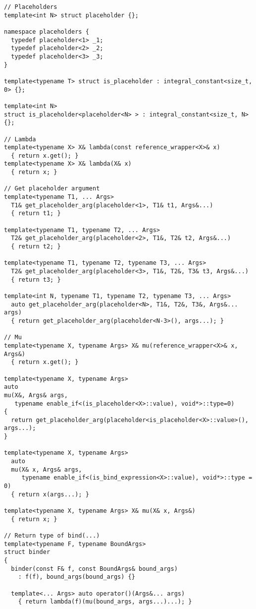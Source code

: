 \documentclass{article}
\begin{document}
\small
\begin{verbatim}
// Placeholders
template<int N> struct placeholder {};

namespace placeholders {
  typedef placeholder<1> _1;
  typedef placeholder<2> _2;
  typedef placeholder<3> _3;
}

template<typename T> struct is_placeholder : integral_constant<size_t, 0> {};

template<int N> 
struct is_placeholder<placeholder<N> > : integral_constant<size_t, N> {};

// Lambda
template<typename X> X& lambda(const reference_wrapper<X>& x)
  { return x.get(); }
template<typename X> X& lambda(X& x)
  { return x; }

// Get placeholder argument
template<typename T1, ... Args>
  T1& get_placeholder_arg(placeholder<1>, T1& t1, Args&...)
  { return t1; }

template<typename T1, typename T2, ... Args>
  T2& get_placeholder_arg(placeholder<2>, T1&, T2& t2, Args&...)
  { return t2; }

template<typename T1, typename T2, typename T3, ... Args>
  T2& get_placeholder_arg(placeholder<3>, T1&, T2&, T3& t3, Args&...)
  { return t3; }

template<int N, typename T1, typename T2, typename T3, ... Args>
  auto get_placeholder_arg(placeholder<N>, T1&, T2&, T3&, Args&... args)
  { return get_placeholder_arg(placeholder<N-3>(), args...); }

// Mu
template<typename X, typename Args> X& mu(reference_wrapper<X>& x, Args&)
  { return x.get(); }

template<typename X, typename Args>
auto 
mu(X&, Args& args, 
   typename enable_if<(is_placeholder<X>::value), void*>::type=0)
{ 
  return get_placeholder_arg(placeholder<is_placeholder<X>::value>(), args...);
}

template<typename X, typename Args>
  auto 
  mu(X& x, Args& args, 
     typename enable_if<(is_bind_expression<X>::value), void*>::type = 0)
  { return x(args...); }

template<typename X, typename Args> X& mu(X& x, Args&)
  { return x; }

// Return type of bind(...)
template<typename F, typename BoundArgs>
struct binder
{
  binder(const F& f, const BoundArgs& bound_args)
    : f(f), bound_args(bound_args) {}

  template<... Args> auto operator()(Args&... args)
    { return lambda(f)(mu(bound_args, args...)...); }


\end{verbatim}
\end{document}
